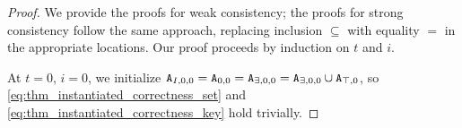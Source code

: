 \documentclass{article}
\numberwithin{equation}{section}
\renewcommand{\tt}[1]{\ifmmode\text{\texttt{#1}}\else\texttt{#1}\fi}
\begin{document}
\begin{proof}
We provide the proofs for weak consistency; the proofs for strong consistency follow the same approach, replacing inclusion $\subseteq$ with equality $=$ in the appropriate locations.
Our proof proceeds by induction on $t$ and $i$.

At $t=0$, $i=0$, we initialize $\tt{A}_{I,0,0} = \tt{A}_{0,0} = \tt{A}_{\exists,0,0} = \tt{A}_{\exists,0,0} \cup \tt{A}_{\top,0}$, so \eqref{eq:thm_instantiated_correctness_set} and \eqref{eq:thm_instantiated_correctness_key} hold trivially.


\end{proof}
\end{document}
